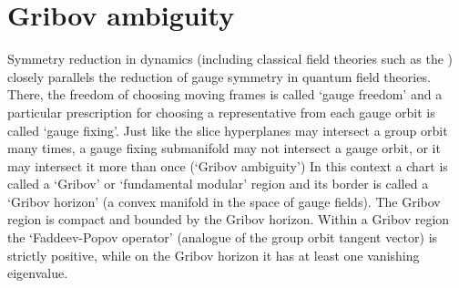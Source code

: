 
\chapter{Gribov ambiguity}
\label{c-Gribov}


Symmetry reduction in dynamics (including classical field theories such
as the \NSe) closely parallels the reduction of gauge symmetry in
quantum field theories. There, the freedom of choosing moving frames
 is called `gauge freedom' and a
particular prescription for choosing a representative from each gauge
orbit is called `gauge fixing'. Just like the slice hyperplanes
may intersect a group orbit many times, a gauge
fixing submanifold may not intersect a gauge orbit, or it may intersect
it more than once (`Gribov ambiguity') In this
context a chart is called a `Gribov' or `fundamental modular' region and
its border is called a `Gribov horizon' (a convex manifold in the
space of gauge fields). The Gribov region is compact and bounded by the
Gribov horizon. Within a Gribov region the `Faddeev-Popov operator'
(analogue of the group orbit tangent vector) is strictly positive, while on
the Gribov horizon it has at least one vanishing eigenvalue.


